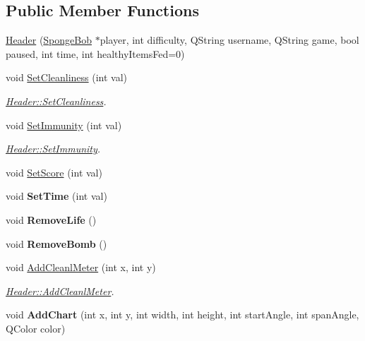 \subsection*{Public Member Functions}
\begin{DoxyCompactItemize}
\item 
\hyperlink{classHeader_aa3cc08748158b541569bdd03649e62ff}{Header} (\hyperlink{classSpongeBob}{Sponge\-Bob} $\ast$player, int difficulty, Q\-String username, Q\-String game, bool paused, int time, int healthy\-Items\-Fed=0)
\item 
void \hyperlink{classHeader_a0a9d3d93d2a79b79ef29edfa1d5bdac2}{Set\-Cleanliness} (int val)
\begin{DoxyCompactList}\small\item\em \hyperlink{classHeader_a0a9d3d93d2a79b79ef29edfa1d5bdac2}{Header\-::\-Set\-Cleanliness}. \end{DoxyCompactList}\item 
void \hyperlink{classHeader_aa99fe86fab6bfe26278e186ba8426d2b}{Set\-Immunity} (int val)
\begin{DoxyCompactList}\small\item\em \hyperlink{classHeader_aa99fe86fab6bfe26278e186ba8426d2b}{Header\-::\-Set\-Immunity}. \end{DoxyCompactList}\item 
void \hyperlink{classHeader_aca556237518231a45ec6f7333d1f1631}{Set\-Score} (int val)
\item 
\hypertarget{classHeader_a8a2130ccbe80b5c1c6b980d63b3ad5fd}{void {\bfseries Set\-Time} (int val)}\label{classHeader_a8a2130ccbe80b5c1c6b980d63b3ad5fd}

\item 
\hypertarget{classHeader_acbb8865a147989d7da5cc2d57b5f5d03}{void {\bfseries Remove\-Life} ()}\label{classHeader_acbb8865a147989d7da5cc2d57b5f5d03}

\item 
\hypertarget{classHeader_ad5f7808b4a879f8a0b9fe1f6b07c59f9}{void {\bfseries Remove\-Bomb} ()}\label{classHeader_ad5f7808b4a879f8a0b9fe1f6b07c59f9}

\item 
void \hyperlink{classHeader_a715193e0d8b55c16fe7c205cd347ac5a}{Add\-Cleanl\-Meter} (int x, int y)
\begin{DoxyCompactList}\small\item\em \hyperlink{classHeader_a715193e0d8b55c16fe7c205cd347ac5a}{Header\-::\-Add\-Cleanl\-Meter}. \end{DoxyCompactList}\item 
\hypertarget{classHeader_a541c329b4ba77a9ab3004c23b43d1d76}{void {\bfseries Add\-Chart} (int x, int y, int width, int height, int start\-Angle, int span\-Angle, Q\-Color color)}\label{classHeader_a541c329b4ba77a9ab3004c23b43d1d76}


\end{DoxyCompactItemize}

